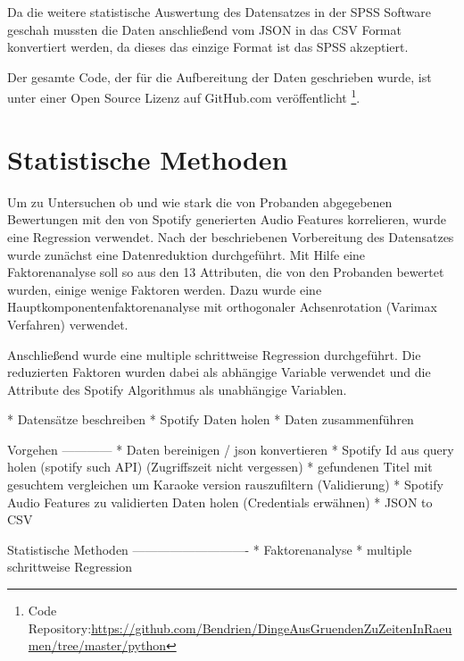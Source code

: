 Da die weitere statistische Auswertung des Datensatzes in der SPSS Software geschah mussten die Daten anschließend vom JSON in das CSV Format konvertiert werden, da dieses das einzige Format ist das SPSS akzeptiert.

Der gesamte Code, der für die Aufbereitung der Daten geschrieben wurde, ist unter einer Open Source Lizenz auf GitHub.com veröffentlicht \footnote{Code Repository:\url{https://github.com/Bendrien/DingeAusGruendenZuZeitenInRaeumen/tree/master/python}}.



\section*{Statistische Methoden}
\label{sec:Statistische Methoden}

Um zu Untersuchen ob und wie stark die von Probanden abgegebenen Bewertungen mit den von Spotify generierten Audio Features korrelieren, wurde eine Regression verwendet.
Nach der beschriebenen Vorbereitung des Datensatzes wurde zunächst eine Datenreduktion durchgeführt.
Mit Hilfe eine Faktorenanalyse soll so aus den 13 Attributen, die von den Probanden bewertet wurden, einige wenige Faktoren werden.
Dazu wurde eine Hauptkomponentenfaktorenanalyse mit orthogonaler Achsenrotation (Varimax Verfahren) verwendet.

Anschließend wurde eine multiple schrittweise Regression durchgeführt.
Die reduzierten Faktoren wurden dabei als abhängige Variable verwendet und die Attribute des Spotify Algorithmus als unabhängige Variablen.





 * Datensätze beschreiben
 * Spotify Daten holen
 * Daten zusammenführen

Vorgehen
------------
 * Daten bereinigen / json konvertieren
 * Spotify Id aus query holen (spotify such API) (Zugriffszeit nicht vergessen)
 * gefundenen Titel mit gesuchtem vergleichen um Karaoke version rauszufiltern (Validierung)
 * Spotify Audio Features zu validierten Daten holen (Credentials erwähnen)
 * JSON to CSV
 

Statistische Methoden
----------------------------
 * Faktorenanalyse
 * multiple schrittweise Regression
